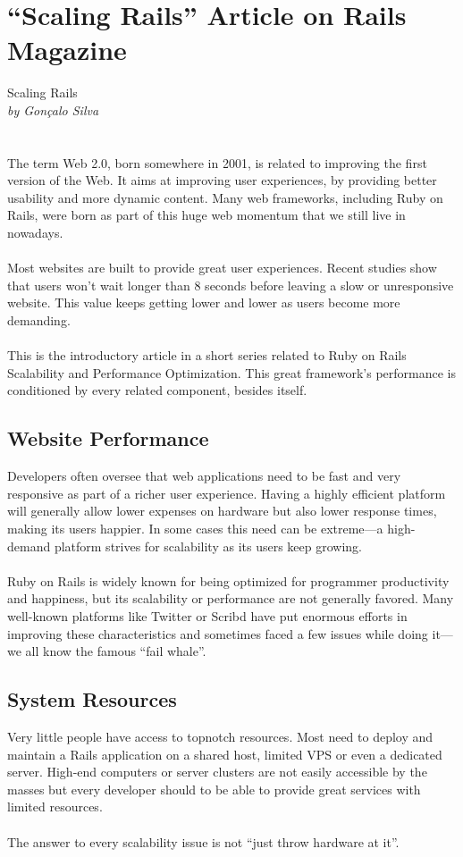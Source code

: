 \chapter{“Scaling Rails” Article on Rails Magazine} %
\label{ap:rails_magazine}

Scaling Rails\\
\textit{by Gonçalo Silva}\\\\\\
The term Web 2.0, born somewhere in 2001, is related to improving the first version of the Web. It aims at improving user experiences, by providing better usability and more dynamic content. Many web frameworks, including Ruby on Rails, were born as part of this huge web momentum that we still live in nowadays.\\\\
Most websites are built to provide great user experiences. Recent studies show that users won't wait longer than 8 seconds before leaving a slow or unresponsive website. This value keeps getting lower and lower as users become more demanding.\\\\
This is the introductory article in a short series related to Ruby on Rails Scalability and Performance Optimization. This great framework's performance is conditioned by every related component, besides itself.

\section{Website Performance}
Developers often oversee that web applications need to be fast and very responsive as part of a richer user experience. Having a highly efficient platform will generally allow lower expenses on hardware but also lower response times, making its users happier. In some cases this  need can be extreme---a high-demand platform strives for scalability as its users keep growing.\\\\
Ruby on Rails is widely known for being optimized for programmer productivity and happiness, but its scalability or performance are not generally favored. Many well-known platforms like Twitter or Scribd have put enormous efforts in improving these characteristics and sometimes faced a few issues while doing it---we all know the famous ``fail whale''.

\section{System Resources}
Very little people have access to topnotch resources. Most need to deploy and maintain a Rails application on a shared host, limited VPS or even a dedicated server. High-end computers or server clusters are not easily accessible by the masses but every developer should to be able to provide great services with limited resources.\\\\
The answer to every scalability issue is not ``just throw hardware at it''.

